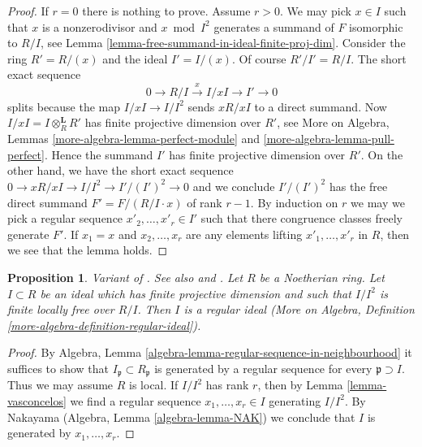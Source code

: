 \documentclass{stacks-project}
\newenvironment{reference}{\comment}{\endcomment}
\theoremstyle{plain}
\newtheorem{proposition}[subsection]{Proposition}
\theoremstyle{definition}
\theoremstyle{remark}
\numberwithin{equation}{subsection}
\begin{document}
\begin{proof}
If $r = 0$ there is nothing to prove. Assume $r > 0$. We may pick
$x \in I$ such that $x$ is a nonzerodivisor and $x \bmod I^2$
generates a summand of $F$ isomorphic to $R/I$, see
Lemma \ref{lemma-free-summand-in-ideal-finite-proj-dim}.
Consider the ring $R' = R/(x)$ and the ideal $I' = I/(x)$.
Of course $R'/I' = R/I$. The short exact sequence
$$
0 \to R/I \xrightarrow{x} I/xI \to I' \to 0
$$
splits because the map $I/xI \to I/I^2$ sends $xR/xI$
to a direct summand. Now $I/xI = I \otimes_R^\mathbf{L} R'$ has
finite projective dimension over $R'$, see
More on Algebra, Lemmas \ref{more-algebra-lemma-perfect-module} and
\ref{more-algebra-lemma-pull-perfect}.
Hence the summand $I'$ has finite projective dimension over $R'$.
On the other hand, we have the short exact sequence
$0 \to xR/xI \to I/I^2 \to I'/(I')^2 \to 0$ and we conclude
$I'/(I')^2$ has the free direct summand $F' = F/(R/I \cdot x)$
of rank $r - 1$. By induction on $r$ we may
we pick a regular sequence $x'_2, \ldots, x'_r \in I'$
such that there congruence classes freely generate $F'$.
If $x_1 = x$ and $x_2, \ldots, x_r$ are any elements lifting
$x'_1, \ldots, x'_r$ in $R$, then we see that the lemma holds.
\end{proof}

\begin{proposition}
\label{proposition-regular-ideal}
\begin{reference}
Variant of \cite[Corollary 1]{Vasconcelos}. See also
\cite{Iyengar} and \cite{Ferrand-lci}.
\end{reference}
Let $R$ be a Noetherian ring. Let $I \subset R$ be an ideal
which has finite projective dimension and such that $I/I^2$ is
finite locally free over $R/I$. Then $I$ is a regular ideal
(More on Algebra, Definition \ref{more-algebra-definition-regular-ideal}).
\end{proposition}

\begin{proof}
By Algebra, Lemma \ref{algebra-lemma-regular-sequence-in-neighbourhood}
it suffices to show that $I_\mathfrak p \subset R_\mathfrak p$ is generated
by a regular sequence for every $\mathfrak p \supset I$. Thus we may
assume $R$ is local. If $I/I^2$ has rank $r$, then by
Lemma \ref{lemma-vasconcelos} we find a regular sequence
$x_1, \ldots, x_r \in I$ generating $I/I^2$. By
Nakayama (Algebra, Lemma \ref{algebra-lemma-NAK})
we conclude that $I$ is generated by $x_1, \ldots, x_r$.
\end{proof}
\end{document}

